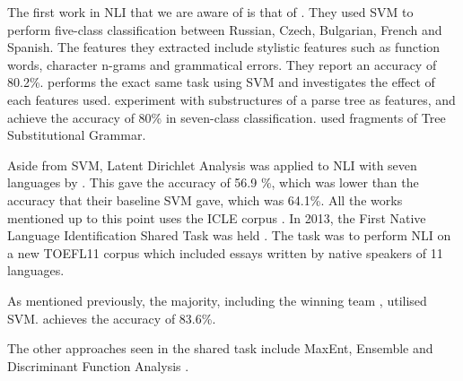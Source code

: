 The first work in NLI that we are aware of is that of \cite{koppel2005determining}.
They used SVM to perform five-class classification between Russian, Czech, Bulgarian, French and Spanish.
The features they extracted include stylistic features such as function words, character n-grams and grammatical errors.
They report an accuracy of 80.2\%.
\cite{tsur2007using} performs the exact same task using SVM and investigates the effect of each features used.
\cite{wong2011exploiting} experiment with substructures of a parse tree as features, and achieve the accuracy of 80\% in seven-class classification.
\cite{swanson2012native} used fragments of Tree Substitutional Grammar.

Aside from SVM, Latent Dirichlet Analysis was applied to NLI with seven languages by \cite{dras2011topic}.
This gave the accuracy of 56.9 \%, which was lower than the accuracy that their baseline SVM gave, which was 64.1\%.
All the works mentioned up to this point uses the ICLE corpus \citep{granger2002international}.
In 2013, the First Native Language Identification Shared Task was held \citep{tetreault2013report}.
The task was to perform NLI on a new TOEFL11 corpus \citep{tetreault2013report} which included essays written by native speakers of 11 languages.

As mentioned previously, the majority, including the winning team  \citep{jarvis2013maximizing}, utilised SVM.
\cite{jarvis2013maximizing} achieves the accuracy of 83.6\%.

The other approaches seen in the shared task include MaxEnt, Ensemble and Discriminant Function Analysis \citep{tetreault2013report}.

